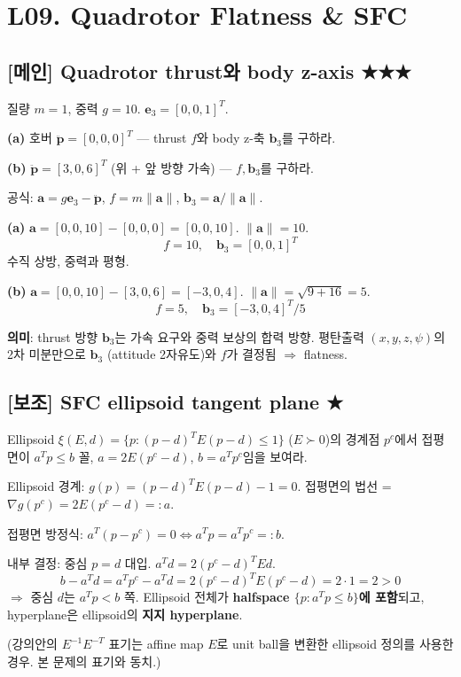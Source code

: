 \documentclass[11pt,a4paper]{article}
\begin{document}
\section{L09. Quadrotor Flatness \& SFC}

\subsection*{[메인] Quadrotor thrust와 body z-axis \hfill ★★★}

\begin{prob}
질량 $m = 1$, 중력 $g = 10$. $\mathbf{e}_3 = [0, 0, 1]^T$.

\textbf{(a)} 호버 $\ddot{\mathbf{p}} = [0, 0, 0]^T$ --- thrust $f$와 body z-축 $\mathbf{b}_3$를 구하라.

\textbf{(b)} $\ddot{\mathbf{p}} = [3, 0, 6]^T$ (위 + 앞 방향 가속) --- $f, \mathbf{b}_3$를 구하라.
\end{prob}

\begin{sol}
공식: $\mathbf{a} = g\mathbf{e}_3 - \ddot{\mathbf{p}}$, $f = m\|\mathbf{a}\|$, $\mathbf{b}_3 = \mathbf{a}/\|\mathbf{a}\|$.

\textbf{(a)} $\mathbf{a} = [0, 0, 10] - [0, 0, 0] = [0, 0, 10]$. $\|\mathbf{a}\| = 10$.
\[\boxed{f = 10,\quad \mathbf{b}_3 = [0, 0, 1]^T}\]
수직 상방, 중력과 평형.

\textbf{(b)} $\mathbf{a} = [0, 0, 10] - [3, 0, 6] = [-3, 0, 4]$. $\|\mathbf{a}\| = \sqrt{9 + 16} = 5$.
\[\boxed{f = 5,\quad \mathbf{b}_3 = [-3, 0, 4]^T / 5}\]

\textbf{의미}: thrust 방향 $\mathbf{b}_3$는 가속 요구와 중력 보상의 합력 방향. 평탄출력 $(x, y, z, \psi)$의 2차 미분만으로 $\mathbf{b}_3$ (attitude 2자유도)와 $f$가 결정됨 $\Rightarrow$ flatness.
\end{sol}

\subsection*{[보조] SFC ellipsoid tangent plane \hfill ★}

\begin{prob}
Ellipsoid $\xi(E, d) = \{p : (p - d)^T E (p - d) \le 1\}$ ($E \succ 0$)의 경계점 $p^c$에서 접평면이 $a^T p \le b$ 꼴, $a = 2E(p^c - d)$, $b = a^T p^c$임을 보여라.
\end{prob}

\begin{sol}
Ellipsoid 경계: $g(p) = (p - d)^T E(p - d) - 1 = 0$. 접평면의 법선 = $\nabla g(p^c) = 2 E(p^c - d) =: a$.

접평면 방정식: $a^T(p - p^c) = 0 \iff a^T p = a^T p^c =: b$.

내부 결정: 중심 $p = d$ 대입. $a^T d = 2(p^c - d)^T E d$.
\[
b - a^T d = a^T p^c - a^T d = 2(p^c - d)^T E(p^c - d) = 2 \cdot 1 = 2 > 0
\]
$\Rightarrow$ 중심 $d$는 $a^T p < b$ 쪽. Ellipsoid 전체가 \textbf{halfspace $\{p : a^T p \le b\}$에 포함}되고, hyperplane은 ellipsoid의 \textbf{지지 hyperplane}.

(강의안의 $E^{-1}E^{-T}$ 표기는 affine map $E$로 unit ball을 변환한 ellipsoid 정의를 사용한 경우. 본 문제의 표기와 동치.)
\end{sol}
\end{document}

